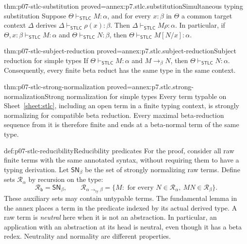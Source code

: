 \begin{hblemma}{thm:p07-stlc-substitution}
 {proved=annex:p7.stlc.substitution}{Simultaneous typing substitution}
Suppose \(\Theta\vdash_{\mathsf{STLC}}M:\alpha\), and for every
\(x:\beta\) in \(\Theta\) a common target context \(\Delta\) derives
\(\Delta\vdash_{\mathsf{STLC}}\rho(x):\beta\). Then
\(\Delta\vdash_{\mathsf{STLC}}M\rho:\alpha\).
In particular, if \(\Theta,x:\beta\vdash_{\mathsf{STLC}}M:\alpha\)
and \(\Theta\vdash_{\mathsf{STLC}}N:\beta\), then
\(\Theta\vdash_{\mathsf{STLC}}M[N/x]:\alpha\).
\end{hblemma}

\begin{hbtheorem}{thm:p07-stlc-subject-reduction}
 {proved=annex:p7.stlc.subject-reduction}{Subject reduction for simple types}
If \(\Theta\vdash_{\mathsf{STLC}}M:\alpha\) and
\(M\to_\beta N\), then \(\Theta\vdash_{\mathsf{STLC}}N:\alpha\).
Consequently, every finite beta reduct has the same type in the same context.
\end{hbtheorem}

\begin{hbtheorem}{thm:p07-stlc-strong-normalization}
 {proved=annex:p7.stlc.strong-normalization}{Strong normalization for simple types}
Every term typable on Sheet~\ref{sheet:stlc}, including an open term in a
finite typing context, is strongly normalizing for compatible beta reduction.
Every maximal beta-reduction sequence from it is therefore finite and ends
at a beta-normal term of the same type.
\end{hbtheorem}

\begin{hbdefinition}{def:p07-stlc-reducibility}{Reducibility predicates}
For the proof, consider all raw finite terms with the same annotated syntax,
without requiring them to have a typing derivation. Let
\(\mathsf{SN}_\beta\) be the set of strongly normalizing raw terms.
Define sets \(\mathcal R_\alpha\) by recursion on the type:
\[
 \mathcal R_{\mathsf b}=\mathsf{SN}_\beta,\qquad
 \mathcal R_{\alpha\mathbin{\to_{\mathrm{ty}}}\beta}
 =\{M:\text{ for every }N\in\mathcal R_\alpha,
                       \ MN\in\mathcal R_\beta\}.
\]
These auxiliary sets may contain untypable terms. The fundamental lemma in
the annex places a term in the predicate indexed by its actual derived type.
A raw term is \emph{neutral} here when it is not an abstraction. In particular,
an application with an abstraction at its head is neutral, even though it
has a beta redex. Neutrality and normality are different properties.
\end{hbdefinition}

